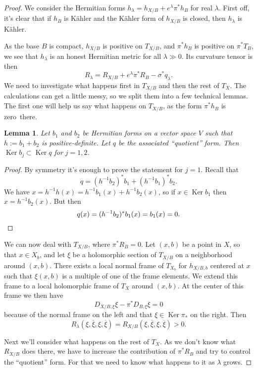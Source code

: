 \documentclass[10pt,a4paper]{amsart}
\newtheorem{lemm}[theo]{Lemma}
\theoremstyle{definition}
\def\ov#1{\overline{#1}}
\DeclareMathOperator{\Ker}{Ker}
\def\kahler{K\"ahler}
\begin{document}
\begin{proof}
We consider the Hermitian forms $h_{\lambda} = h_{X/B} + e^{\lambda} \pi^{*} h_{B}$ for real $\lambda$.
First off, it's clear that if $h_{B}$ is \kahler{} and the \kahler{} form of $h_{X/B}$ is closed, then $h_{\lambda}$ is \kahler{}.

As the base $B$ is compact, $h_{X/B}$ is positive on $T_{X/B}$, and $\pi^{*}h_{B}$ is positive on $\pi^{*}T_{B}$, we see that $h_{\lambda}$ is an honest Hermitian metric for all $\lambda \gg 0$.
Its curvature tensor is then
\[
  R_{\lambda}
  = R_{X/B} + e^{\lambda}\pi^{*}R_{B} - \sigma^{*}q_{\lambda}.
\]
We need to investigate what happens first in $T_{X/B}$ and then the rest of $T_{X}$.
The calculations can get a little messy, so we split them into a few technical lemmas.
The first one will help us say what happens on $T_{X/B}$, as the form
$\pi^{*}h_{B}$ is zero~there.%


\begin{lemm}
Let $b_{1}$ and $b_{2}$ be Hermitian forms on a vector space $V$ such that $h := b_{1} + b_{2}$ is positive-definite.
Let $q$ be the associated ``quotient'' form.
Then $\Ker b_{j} \subset \Ker q$ for $j = 1,2$.
\end{lemm}

\begin{proof}
By symmetry it's enough to prove the statement for $j = 1$.
Recall that
\[
  q = (h^{-1}b_{2})^{*}b_{1} + (h^{-1}b_{1})^{*}b_{2}.
\]
We have $x = h^{-1}h(x) = h^{-1}b_{1}(x) + h^{-1}b_{2}(x)$, so if $x \in \Ker b_{1}$ then $x = h^{-1}b_{2}(x)$.
But then
\begin{equation*}
q(x) = (h^{-1}b_{2})^{*}b_{1}(x) = b_{1}(x) = 0.
\qedhere
\end{equation*}
\end{proof}

We can now deal with $T_{X/B}$, where $\pi^*R_B = 0$.
Let $(x,b)$ be a point in $X$, so that $x \in X_b$, and let $\xi$ be a
holomorphic section of $T_{X/B}$ on a neighborhood around $(x,b)$.
There exists a local normal frame of $T_{X_b}$ for $h_{X/B,b}$ centered at $x$
such that $\xi(x,b)$ is a multiple of one of the frame elements.
We extend this frame to a local holomorphic frame of $T_X$ around $(x,b)$.
At the center of this frame we then have
\[
D_{X/B, \xi} \xi - \pi^* D_{B, \xi} \xi = 0
\]
because of the normal frame on the left and that $\xi \in \Ker \pi_*$ on the right.
Then
\[
R_\lambda(\xi,\ov\xi,\xi,\ov\xi)
= R_{X/B}(\xi,\ov\xi,\xi,\ov\xi)
> 0.
\]

Next we'll consider what happens on the rest of $T_{X}$.
As we don't know what $R_{X/B}$ does there, we have to increase the contribution of $\pi^{*}R_{B}$ and try to control the ``quotient'' form.
For that we need to know what happens to it as $\lambda$ grows.




\end{proof}
\end{document}
